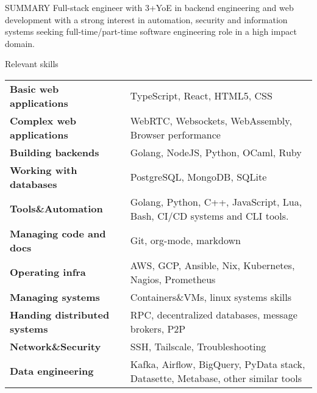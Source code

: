 \documentclass{resume} %
\begin{document}

\begin{rSection}{SUMMARY}
  {Full-stack engineer with 3+YoE in backend engineering and web development with a strong interest in automation, security and information systems seeking full-time/part-time software engineering role in a high impact domain.}
\end{rSection}

\begin{rSection}{Relevant skills}
  \begin{tabular}{ @{} >{\bfseries}l @{\hspace{6ex}} l }
    Basic web applications & TypeScript, React, HTML5, CSS\\
    Complex web applications & WebRTC, Websockets, WebAssembly, Browser performance\\
    Building backends & Golang, NodeJS, Python, OCaml, Ruby\\
    Working with databases & PostgreSQL, MongoDB, SQLite\\
    Tools\&Automation & Golang, Python, C++, JavaScript, Lua, Bash, CI/CD systems and CLI tools.\\
    Managing code and docs & Git, org-mode, markdown\\
    Operating infra & AWS, GCP, Ansible, Nix, Kubernetes, Nagios, Prometheus\\
    Managing systems & Containers\&VMs, linux systems skills\\
    Handing distributed systems & RPC, decentralized databases, message brokers, P2P\\
    Network\&Security & SSH, Tailscale, Troubleshooting\\
    Data engineering & Kafka, Airflow, BigQuery, PyData stack, Datasette, Metabase, other similar tools\\
  \end{tabular}\
\end{rSection}
\end{document}
